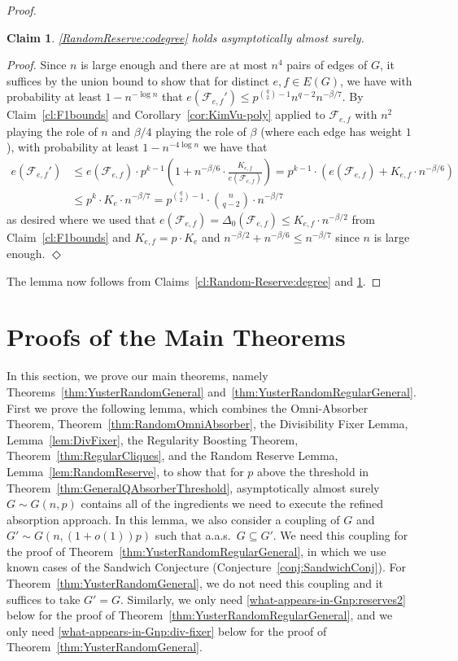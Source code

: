 \documentclass[11pt]{article}
\numberwithin{equation}{section}
\newcounter{i}
\theoremstyle{plain}
\newtheorem{claim}{Claim}[thm]
\newenvironment{proofclaim}[1][]%
{\noindent \emph{Proof.} {}{#1}{}}{\hfill
	$\Diamond$\vspace{1em}}
\theoremstyle{plain} %
\theoremstyle{definition}
\newcommand{\cF}{\mathcal{F}}
\newcommand{\aas}{a.a.s.\ }
\begin{document}
\begin{proof}
\begin{claim}\label{cl:Random-Reserve:codegree}
\ref{RandomReserve:codegree} holds asymptotically almost surely.
\end{claim}
\begin{proofclaim}
Since $n$ is large enough and there are at most $n^4$ pairs of edges of $G$, it suffices by the union bound to show that for distinct $e,f\in E(G)$, we have with probability at least $1-n^{-\log n}$ that $e(\cF_{e,f}') \le p^{\binom{q}{2} - 1}n^{q - 2}n^{-\beta/7}$.
By Claim~\ref{cl:F1bounds} and Corollary~\ref{cor:KimVu-poly} applied to $\cF_{e,f}$ with $n^2$ playing the role of $n$ and $\beta/4$ playing the role of $\beta$ (where each edge has weight $1$),  with probability at least $1-n^{-4\log n}$ we have that
\begin{align*}
e(\cF_{e,f}') &\le e(\cF_{e,f})\cdot p^{k-1} \left(1+n^{-\beta/6}\cdot \frac{K_{e,f}}{e(\cF_{e,f})}\right)=p^{k-1}\cdot (e(\cF_{e,f})+ K_{e,f}\cdot n^{-\beta/6}) \\
&\le p^k\cdot K_{e}\cdot n^{-\beta/7}= p^{\binom{q}{2}-1}\cdot \binom{n}{q -2} \cdot n^{-\beta/7}
\end{align*}
as desired where we used that $e(\cF_{e,f}) = \Delta_0(\cF_{e,f})\le K_{e,f}\cdot n^{-\beta/2}$ from Claim~\ref{cl:F1bounds} and $K_{e,f} = p \cdot K_{e}$ and $n^{-\beta/2}+n^{-\beta/6}\le n^{-\beta/7}$ since $n$ is large enough.
\end{proofclaim}

\noindent The lemma now follows from Claims~\ref{cl:Random-Reserve:degree} and \ref{cl:Random-Reserve:codegree}.
\end{proof}

\section{Proofs of the Main Theorems}\label{s:main-proof}

In this section, we prove our main theorems, namely Theorems~\ref{thm:YusterRandomGeneral} and~\ref{thm:YusterRandomRegularGeneral}.
First we prove the following lemma, which combines the Omni-Absorber Theorem, Theorem~\ref{thm:RandomOmniAbsorber}, the Divisibility 
Fixer Lemma, Lemma~\ref{lem:DivFixer}, the Regularity Boosting Theorem, Theorem~\ref{thm:RegularCliques}, and the Random Reserve Lemma, Lemma~\ref{lem:RandomReserve}, to show that for $p$ above the threshold in Theorem~\ref{thm:GeneralQAbsorberThreshold}, asymptotically almost surely $G \sim G(n,p)$ contains all of the ingredients we need to execute the refined absorption approach.
In this lemma, we also consider a coupling of $G$ and $G' \sim G(n,(1 +o(1))p)$ such that \aas $G \subseteq G'$.  We need this coupling for the proof of Theorem~\ref{thm:YusterRandomRegularGeneral}, in which we use known cases of the Sandwich Conjecture (Conjecture~\ref{conj:SandwichConj}).  For Theorem~\ref{thm:YusterRandomGeneral}, we do not need this coupling and it suffices to take $G' = G$.  Similarly, we only need \ref{what-appears-in-Gnp:reserves2} below for the proof of Theorem~\ref{thm:YusterRandomRegularGeneral}, and we only need \ref{what-appears-in-Gnp:div-fixer} below for the proof of Theorem~\ref{thm:YusterRandomGeneral}.
\end{document}
